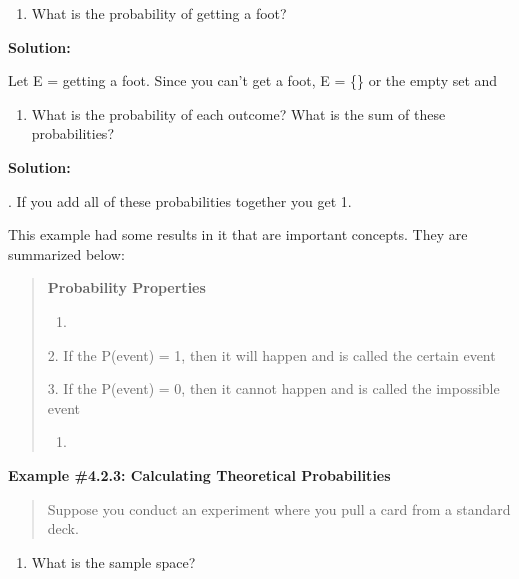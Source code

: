 \documentclass[]{book}
\providecommand{\tightlist}{%
  \setlength{\itemsep}{0pt}\setlength{\parskip}{0pt}}
\begin{document}
\begin{enumerate}
\def\labelenumi{\alph{enumi}.}
\setcounter{enumi}{5}
\tightlist
\item
  What is the probability of getting a foot?
\end{enumerate}

\textbf{Solution:}

Let E = getting a foot. Since you can't get a foot, E = \{\} or the
empty set and

\begin{enumerate}
\def\labelenumi{\alph{enumi}.}
\setcounter{enumi}{6}
\tightlist
\item
  What is the probability of each outcome? What is the sum of these
  probabilities?
\end{enumerate}

\textbf{Solution:}

. If you add all of these probabilities together you get 1.

This example had some results in it that are important concepts. They
are summarized below:

\begin{quote}
\textbf{Probability Properties}

\begin{enumerate}
\def\labelenumi{\arabic{enumi}.}
\item
\end{enumerate}

2. If the P(event) = 1, then it will happen and is called the certain
event

3. If the P(event) = 0, then it cannot happen and is called the
impossible event

\begin{enumerate}
\def\labelenumi{\arabic{enumi}.}
\setcounter{enumi}{3}
\item
\end{enumerate}
\end{quote}

\textbf{Example \#4.2.3: Calculating Theoretical Probabilities}

\begin{quote}
Suppose you conduct an experiment where you pull a card from a
standard deck.
\end{quote}

\begin{enumerate}
\def\labelenumi{\alph{enumi}.}
\tightlist
\item
  What is the sample space?
\end{enumerate}
\end{document}
